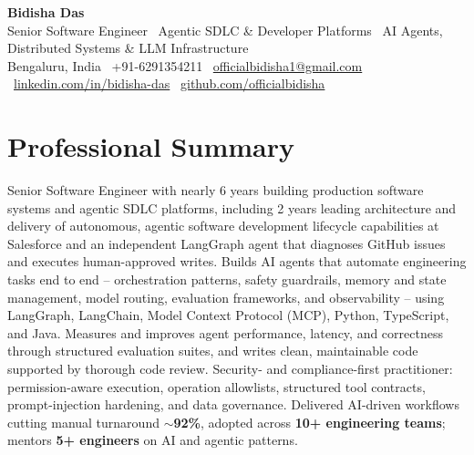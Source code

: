 \documentclass[10.5pt,letterpaper]{article}
\begin{document}
\begin{center}
    {\LARGE \textbf{Bidisha Das}}\\[2pt]
    Senior Software Engineer \textbar\ Agentic SDLC \& Developer Platforms \textbar\ AI Agents, Distributed Systems \& LLM Infrastructure\\[2pt]
    Bengaluru, India \textbar\ +91-6291354211 \textbar\ \href{mailto:officialbidisha1@gmail.com}{officialbidisha1@gmail.com} \textbar\
    \href{https://linkedin.com/in/bidisha-das/}{linkedin.com/in/bidisha-das} \textbar\
    \href{https://github.com/officialbidisha}{github.com/officialbidisha}
\end{center}

\section*{Professional Summary}
Senior Software Engineer with nearly 6 years building production software systems and agentic SDLC platforms, including 2 years leading architecture and delivery of autonomous, agentic software development lifecycle capabilities at Salesforce and an independent LangGraph agent that diagnoses GitHub issues and executes human-approved writes. Builds AI agents that automate engineering tasks end to end -- orchestration patterns, safety guardrails, memory and state management, model routing, evaluation frameworks, and observability -- using LangGraph, LangChain, Model Context Protocol (MCP), Python, TypeScript, and Java. Measures and improves agent performance, latency, and correctness through structured evaluation suites, and writes clean, maintainable code supported by thorough code review. Security- and compliance-first practitioner: permission-aware execution, operation allowlists, structured tool contracts, prompt-injection hardening, and data governance. Delivered AI-driven workflows cutting manual turnaround \textbf{$\sim$92\%}, adopted across \textbf{10+ engineering teams}; mentors \textbf{5+ engineers} on AI and agentic patterns.

\end{document}
